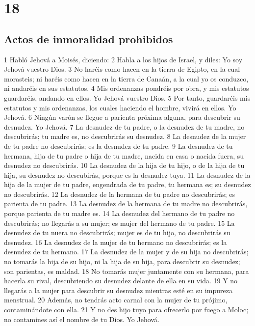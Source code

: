 \chapter{18}

\section{Actos de inmoralidad prohibidos}

1 Habló Jehová a Moisés, diciendo:
2 Habla a los hijos de Israel, y diles: Yo soy Jehová vuestro Dios.
3 No haréis como hacen en la tierra de Egipto, en la cual morasteis; ni haréis como hacen en la tierra de Canaán, a la cual yo os conduzco, ni andaréis en sus estatutos.
4 Mis ordenanzas pondréis por obra, y mis estatutos guardaréis, andando en ellos. Yo Jehová vuestro Dios.
5 Por tanto, guardaréis mis estatutos y mis ordenanzas, los cuales haciendo el hombre, vivirá en ellos. Yo Jehová.
6 Ningún varón se llegue a parienta próxima alguna, para descubrir su desnudez. Yo Jehová.
7 La desnudez de tu padre, o la desnudez de tu madre, no descubrirás; tu madre es, no descubrirás su desnudez.
8 La desnudez de la mujer de tu padre no descubrirás; es la desnudez de tu padre.
9 La desnudez de tu hermana, hija de tu padre o hija de tu madre, nacida en casa o nacida fuera, su desnudez no descubrirás.
10 La desnudez de la hija de tu hijo, o de la hija de tu hija, su desnudez no descubirás, porque es la desnudez tuya.
11 La desnudez de la hija de la mujer de tu padre, engendrada de tu padre, tu hermana es; su desnudez no descubrirás.
12 La desnudez de la hermana de tu padre no descubrirás; es parienta de tu padre.
13 La desnudez de la hermana de tu madre no descubrirás, porque parienta de tu madre es.
14 La desnudez del hermano de tu padre no descubrirás; no llegarás a su mujer; es mujer del hermano de tu padre.
15 La desnudez de tu nuera no descubrirás; mujer es de tu hijo, no descubrirás su desnudez.
16 La desnudez de la mujer de tu hermano no descubrirás; es la desnudez de tu hermano.
17 La desnudez de la mujer y de su hija no descubrirás; no tomarás la hija de su hijo, ni la hija de su hija, para descubrir su desnudez; son parientas, es maldad.
18 No tomarás mujer juntamente con su hermana, para hacerla su rival, descubriendo su desnudez delante de ella en su vida.
19 Y no llegarás a la mujer para descubrir su desnudez mientras esté en su impureza menstrual.
20 Además, no tendrás acto carnal con la mujer de tu prójimo, contaminándote con ella.
21 Y no des hijo tuyo para ofrecerlo por fuego a Moloc; no contamines así el nombre de tu Dios. Yo Jehová.
